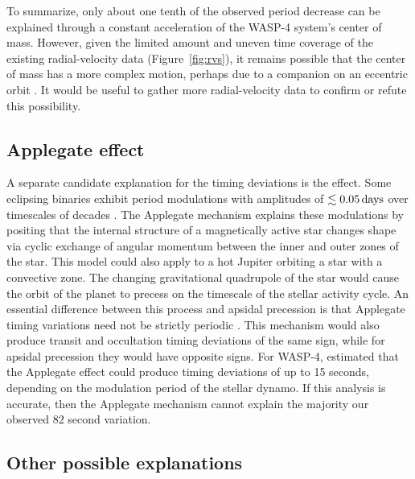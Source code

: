 \documentclass[12pt,twocolumn,tighten]{aastex62}
\begin{document}
To summarize, only about one tenth of the observed period decrease can
be explained through a constant acceleration of the WASP-4 system's
center of mass.  However, given the limited amount and uneven time
coverage of the existing radial-velocity data (Figure~\ref{fig:rvs}),
it remains possible that the center of mass has a more complex motion,
perhaps due to a companion on an eccentric orbit \citep[{\it e.g.},
WASP-53 or WASP-81,][]{triaud_peculiar_2017}.  It would be useful to
gather more radial-velocity data to confirm or refute this
possibility.


\subsection{Applegate effect}

A separate candidate explanation for the timing deviations is the
\citet{applegate_mechanism_1992} effect.  Some eclipsing binaries
exhibit period modulations with amplitudes of $\lesssim 0.05\,{\rm
days}$ over timescales of decades \citep[{\it
e.g.},][]{soderhjelm_geometry_1980,hall_relation_1989}.  The Applegate
mechanism explains these modulations by positing that the internal
structure of a magnetically active star changes shape via cyclic
exchange of angular momentum between the inner and outer zones of the
star.  This model could also apply to a hot Jupiter orbiting a star
with a convective zone.  The changing gravitational quadrupole of the
star would cause the orbit of the planet to precess on the timescale
of the stellar activity cycle.  An essential difference between this
process and apsidal precession is that Applegate timing variations
need not be strictly periodic \citep[{\it
e.g.},][Figure~12]{soderhjelm_geometry_1980}. This mechanism would
also produce transit and occultation timing deviations of the same
sign, while for apsidal precession they would have opposite signs.
For WASP-4, \citet{watson_orbital_2010} estimated that the Applegate
effect could produce timing deviations of up to 15 seconds, depending
on the modulation period of the stellar dynamo.  If this analysis is
accurate, then the Applegate mechanism cannot explain the majority our
observed $82$ second variation.


\subsection{Other possible explanations}
\end{document}
